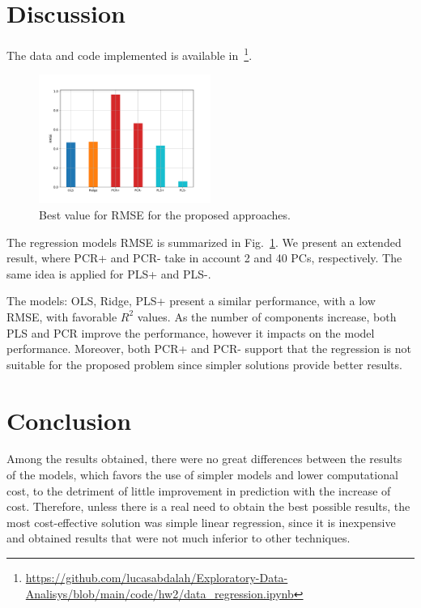 \section{Discussion}

The data and code implemented is available in~\footnote{\url{https://github.com/lucasabdalah/Exploratory-Data-Analisys/blob/main/code/hw2/data_regression.ipynb}}.

\begin{figure}[htbp!]
  \centerline{\includegraphics[width=0.5\textwidth]{../../code/hw2/figures/5-summary.pdf}}
  \caption{Best value for RMSE for the proposed approaches.}
  \label{fig:5-summary}
\end{figure}

The regression models RMSE is summarized in Fig.~\ref{fig:5-summary}. We present an extended result, where PCR+ and PCR- take in account 2 and 40 PCs, respectively. The same idea is applied for PLS+ and PLS-. 

The models: OLS, Ridge, PLS+ present a similar performance, with a low RMSE, with favorable $R^2$ values. As the number of components increase, both PLS and PCR improve the performance, however it impacts on the model performance. Moreover, both PCR+ and PCR- support that the regression is not suitable for the proposed problem since simpler solutions provide better results. 

\section{Conclusion}
Among the results obtained, there were no great differences between the results of the models, which favors the use of simpler models and lower computational cost, to the detriment of little improvement in prediction with the increase of cost. Therefore, unless there is a real need to obtain the best possible results, the most cost-effective solution was simple linear regression, since it is inexpensive and obtained results that were not much inferior to other techniques. 

